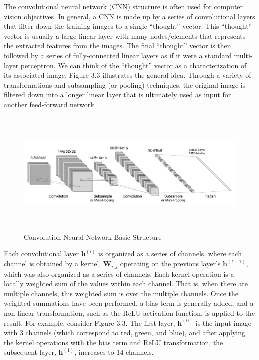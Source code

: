\documentclass [MAS] {uclathes}
\begin{document}
The convolutional neural network (CNN) structure is often used for computer vision objectives. In general, a CNN is made up by a series of convolutional layers that filter down the training images to a single ``thought'' vector. This ``thought'' vector is usually a large linear layer with many nodes/elements that represents the extracted features from the images. The final ``thought'' vector is then followed by a series of fully-connected linear layers as if it were a standard multi-layer perceptron. We can think of the ``thought'' vector as a characterization of its associated image. Figure 3.3 illustrates the general idea. Through a variety of transformations and subsampling (or pooling) techniques, the original image is filtered down into a longer linear layer that is ultimately used as input for another feed-forward network.

\begin{figure}[h]
\centering
\includegraphics[height = 60mm, width=160mm]{imgs/cnn_s1.png}
\caption{Convolution Neural Network Basic Structure}
\label{fig:cnn1}
\end{figure}

Each convolutional layer $\mathbf{h}^{(l)}$ is organized as a series of channels, where each channel is obtained by a kernel, $\mathbf{W}_{i, j}$ operating on the previous layer's $\mathbf{h}^{(l-1)}$, which was also organized as a series of channels.  Each kernel operation is a locally weighted sum of the values within each channel. That is, when there are multiple channels, this weighted sum is over the multiple channels. Once the weighted summations have been performed, a bias term is generally added, and a non-linear transformation, such as the ReLU activation function, is applied to the result. For example, consider Figure 3.3. The first layer, $\mathbf{h}^{(0)}$ is the input image with 3 channels (which correspond to red, green, and blue), and after applying the kernel operations with the bias term and ReLU transformation, the subsequent layer, $\mathbf{h}^{(1)}$, increases to 14 channels. 
\end{document}
